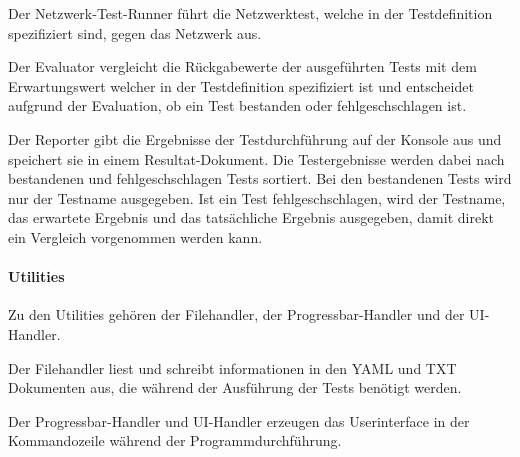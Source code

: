 \documentclass[]{subfiles}
\begin{document}
Der Netzwerk-Test-Runner führt die Netzwerktest, welche in der Testdefinition spezifiziert
sind, gegen das Netzwerk aus.

Der Evaluator vergleicht die Rückgabewerte der ausgeführten Tests mit dem Erwartungswert
welcher in der Testdefinition spezifiziert ist und entscheidet aufgrund der Evaluation,
ob ein Test bestanden oder fehlgeschschlagen ist.

Der Reporter gibt die Ergebnisse der Testdurchführung auf der Konsole aus und 
speichert sie in einem Resultat-Dokument.
Die Testergebnisse werden dabei nach bestandenen und fehlgeschschlagen Tests sortiert.
Bei den bestandenen Tests wird nur der Testname ausgegeben.
Ist ein Test fehlgeschschlagen, wird der Testname, das erwartete Ergebnis und das 
tatsächliche Ergebnis ausgegeben, damit direkt ein Vergleich vorgenommen werden kann. 

\paragraph{Utilities}
Zu den Utilities gehören der Filehandler, der Progressbar-Handler und der UI-Handler.

Der Filehandler liest und schreibt informationen in den YAML und TXT Dokumenten aus,
die während der Ausführung der Tests benötigt werden.

Der Progressbar-Handler und UI-Handler erzeugen das Userinterface in der Kommandozeile
während der Programmdurchführung.
\end{document}
